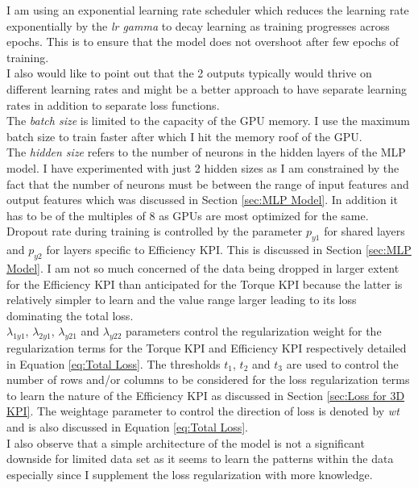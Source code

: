 \documentclass{report} %
\begin{document}
I am using an exponential learning rate scheduler which reduces the learning rate exponentially by the \textit{lr gamma} to decay learning as training progresses across epochs.
This is to ensure that the model does not overshoot after few epochs of training.\\
I also would like to point out that the 2 outputs typically would thrive on different learning rates and might be a better approach to have separate learning rates in addition 
to separate loss functions.\\
The \textit{batch size} is limited to the capacity of the \ac{GPU} memory. I use the maximum batch size to train faster after which I hit the memory roof of the \ac{GPU}.\\
The \textit{hidden size} refers to the number of neurons in the hidden layers of the \ac{MLP} model. I have experimented with just 2 hidden sizes as I am 
constrained by the fact that the number of neurons must be between the range of input features and output features which was discussed in Section \ref{sec:MLP Model}.
In addition it has to be of the multiples of 8 as \ac{GPU}s are most optimized for the same.\\
Dropout rate during training is controlled by the parameter \textit{$p_{y1}$} for shared layers and \textit{$p_{y2}$} for layers specific to Efficiency \ac{KPI}. 
This is discussed in Section \ref{sec:MLP Model}. I am not so much concerned of the data being dropped in larger extent for the Efficiency \ac{KPI} than anticipated 
for the Torque \ac{KPI} because the latter is relatively simpler to learn and the value range larger leading to its loss dominating the total loss.\\
\textit{$\lambda_{1y1}$}, \textit{$\lambda_{2y1}$}, \textit{$\lambda_{y21}$} and \textit{$\lambda_{y22}$} parameters control the regularization weight for the 
regularization terms for the Torque \ac{KPI} and Efficiency \ac{KPI} respectively detailed in Equation \ref{eq:Total Loss}.
The thresholds \textit{$t_{1}$}, \textit{$t_{2}$} and \textit{$t_{3}$} are used to control the number of rows and/or columns to be considered for the loss
regularization terms to learn the nature of the Efficiency \ac{KPI} as discussed in Section \ref{sec:Loss for 3D KPI}.
The weightage parameter to control the direction of loss is denoted by \textit{wt} and is also discussed in Equation \ref{eq:Total Loss}.\\
I also observe that a simple architecture of the model is not a significant downside for limited data set as it seems to learn the patterns within the data 
especially since I supplement the loss regularization with more knowledge.
\end{document}
